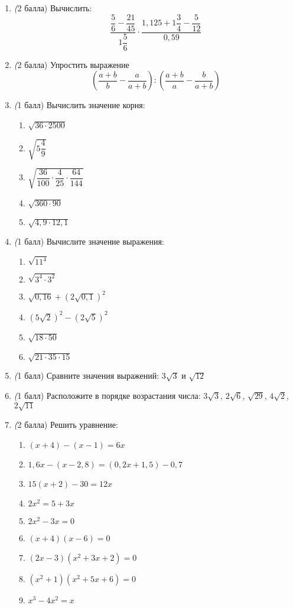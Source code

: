 \documentclass[12pt, a4paper]{article}
\begin{document}
		

\begin{enumerate}
	\item \textit(2 балла) Вычислить:
	$$\dfrac{\dfrac{5}{6}-\dfrac{21}{45}}{1\dfrac{5}{6}}\cdot\dfrac{1,125+1\dfrac{3}{4}-\dfrac{5}{12}}{0,59}$$
	\item \textit(2 балла) Упростить выражение $$\left(\dfrac{a+b}{b}-\dfrac{a}{a+b}\right):\left(\dfrac{a+b}{a}-\dfrac{b}{a+b}\right)$$
	\item \textit(1 балл) Вычислить значение корня:
	\begin{multicols}{2}
		\begin{enumerate}[label=\asbuk*)]
			\item $\sqrt{36\cdot2500}$
			\item $\sqrt{5\dfrac{4}{9}}$
			\item $\sqrt{\dfrac{36}{100}\cdot\dfrac{4}{25}\cdot\dfrac{64}{144}}$
			\item $\sqrt{360\cdot90}$
			\item $\sqrt{4,9\cdot12,1}$
		\end{enumerate}
	\end{multicols}
	\item \textit(1 балл) Вычислите значение выражения:
	\begin{multicols}{2}
		\begin{enumerate}[label=\asbuk*)]
			\item $\sqrt{11^4}$
			\item $\sqrt{3^4\cdot3^2}$
			\item $\sqrt{0,16}+(2\sqrt{0,1})^2$
			\item $(5\sqrt{2})^2-(2\sqrt{5})^2$
			\item $\sqrt{18 \cdot 50}$
			\item $\sqrt{21 \cdot 35 \cdot 15}$
		\end{enumerate}
	\end{multicols}
	\item \textit(1 балл) Сравните значения выражений: $3\sqrt{3}$ и $\sqrt{12}$
	\item \textit(1 балл) Расположите в порядке возрастания числа:
	$3\sqrt{3}$, $2\sqrt{6}$, $\sqrt{29}$, $4\sqrt{2}$, $2\sqrt{11}$
	\item \textit(2 балла) Решить уравнение:
	\begin{multicols}{2}
		\begin{enumerate}[label=\asbuk*)]
			\item $(x+4)-(x-1)=6x$
			\item $1,6x-(x-2,8)=(0,2x+1,5)-0,7$
			\item $15(x+2)-30=12x$
			\item $2x^2=5+3x$
			\item $2x^2-3x=0$
			\item $(x+4)(x-6)=0$
			\item $(2x-3)(x^2+3x+2)=0$
			\item $(x^2+1)(x^2+5x+6)=0$
			\item $x^3-4x^2=x$
		\end{enumerate}
	\end{multicols}
\end{enumerate}
\end{document}
